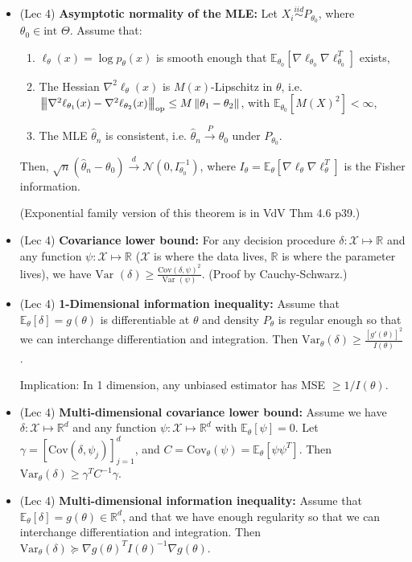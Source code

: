 \documentclass[twoside]{article}
\newcommand{\dis}{\displaystyle}
\newcommand{\norm}[1]{\left\|{#1}\right\|} %
\newcommand{\matrixnorm}[1]{\left|\!\left|\!\left|{#1}
  \right|\!\right|\!\right|} %
\newcommand{\opnorm}[1]{\matrixnorm{#1}_{\rm op}}
\newcommand\bbE{\mathbb{E}}
\newcommand\bbR{\mathbb{R}}
\newcommand\calN{\mathcal{N}}
\newcommand\calX{\mathcal{X}}
\newcommand\dlt{\delta}
\def\t{\theta}
\newcommand\cd{\stackrel{d}{\goesto}}
\newcommand\cp{\stackrel{P}{\goesto}}
\newcommand\goesto{\rightarrow}
\newcommand\var{\text{Var }}
\begin{document}
\begin{itemize}
\item (Lec 4) \textbf{Asymptotic normality of the MLE:} Let $X_i \stackrel{iid}{\sim} P_{\theta_0}$, where $\theta_0 \in \text{int } \Theta$. Assume that:
\begin{enumerate}
\item $\ell_\theta(x) = \log p_\theta(x)$ is smooth enough that $\bbE_{\theta_0}[\nabla \ell_{\theta_0}\nabla \ell_{\theta_0}^T]$ exists,

\item The Hessian $\nabla^2 \ell_\theta(x)$ is $M(x)$-Lipschitz in $\theta$, i.e. $\opnorm{\nabla^2 \ell_{\theta_1}(x) - \nabla^2 \ell_{\theta_2}(x)} \leq M \norm{\theta_1 - \theta_2}$, with $\bbE_{\theta_0}[M(X)^2]< \infty$,

\item The MLE $\hat{\theta}_n$ is consistent, i.e. $\hat{\theta}_n \cp \theta_0$ under $P_{\t_0}$.
\end{enumerate}

Then, $\sqrt n(\hat \theta_n - \theta_0) \cd \calN \left(0, I_{\theta_0}^{-1}\right)$, where $I_\theta = \bbE_\theta [\nabla \ell_{\theta}\nabla \ell_{\theta}^T]$ is the Fisher information.

(Exponential family version of this theorem is in VdV Thm 4.6 p39.)

\item (Lec 4) \textbf{Covariance lower bound:} For any decision procedure $\delta: \calX \mapsto \bbR$ and any function $\psi: \calX \mapsto \bbR$ ($\calX$ is where the data lives, $\bbR$ is where the parameter lives), we have $\var(\delta) \geq \dis\frac{\text{Cov}(\delta,\psi)^2}{\var(\psi)}$. (Proof by Cauchy-Schwarz.)

\item (Lec 4) \textbf{1-Dimensional information inequality:} Assume that $\bbE_\t [\dlt] = g(\t)$ is differentiable at $\t$ and density $P_\t$ is regular enough so that we can interchange differentiation and integration. Then $\text{Var}_\t (\dlt) \geq \dis\frac{[g'(\t)]^2}{I(\t)}$.

Implication: In 1 dimension, any unbiased estimator has MSE $\geq 1/I(\t)$.

\item (Lec 4) \textbf{Multi-dimensional covariance lower bound:} Assume we have $\delta: \calX \mapsto \bbR^d$ and any function $\psi: \calX \mapsto \bbR^d$ with $\bbE_\t [\psi] = 0$. Let $\gamma = \left[ \text{Cov}(\dlt, \psi_j) \right]_{j=1}^d$, and $C = \text{Cov}_\t (\psi) = \bbE_\t [\psi\psi^T]$. Then $\text{Var}_\t(\delta) \geq \gamma^T C^{-1} \gamma$.

\item (Lec 4) \textbf{Multi-dimensional information inequality:} Assume that $\bbE_\t [\dlt] = g(\t) \in \bbR^d$, and that we have enough regularity so that we can interchange differentiation and integration. Then $\text{Var}_\t(\dlt) \succeq \nabla g(\t)^T I(\t)^{-1} \nabla g(\t)$.
\end{itemize}
\end{document}
